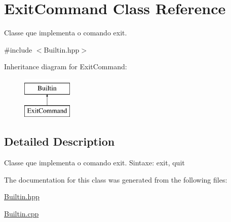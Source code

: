 \hypertarget{classExitCommand}{
\section{ExitCommand Class Reference}
\label{classExitCommand}
}


Classe que implementa o comando exit.  




{\ttfamily \#include $<$Builtin.hpp$>$}

Inheritance diagram for ExitCommand:\begin{figure}[H]
\begin{center}
\leavevmode
\includegraphics[height=2.000000cm]{classExitCommand}
\end{center}
\end{figure}


\subsection{Detailed Description}
Classe que implementa o comando exit. Sintaxe: exit, quit 

The documentation for this class was generated from the following files:\begin{DoxyCompactItemize}
\item 
\hyperlink{Builtin_8hpp}{Builtin.hpp}\item 
\hyperlink{Builtin_8cpp}{Builtin.cpp}\end{DoxyCompactItemize}
